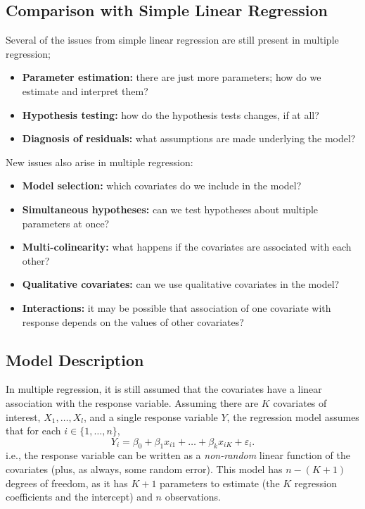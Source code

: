 \documentclass[12pt]{article}
\begin{document}
\subsection{Comparison with Simple Linear Regression}

Several of the issues from simple linear regression are still present in multiple regression; 
\begin{itemize}
    \item \textbf{Parameter estimation:} there are just more parameters; how do we estimate and interpret them?
    \item \textbf{Hypothesis testing:} how do the hypothesis tests changes, if at all?
    \item \textbf{Diagnosis of residuals:} what assumptions are made underlying the model?
\end{itemize}

New issues also arise in multiple regression:

\begin{itemize}
    \item \textbf{Model selection:} which covariates do we include in the model?
    \item \textbf{Simultaneous hypotheses:} can we test hypotheses about multiple parameters at once?
    \item \textbf{Multi-colinearity:} what happens if the covariates are associated with each other?
    \item \textbf{Qualitative covariates:} can we use qualitative covariates in the model?
    \item \textbf{Interactions:} it may be possible that association of one covariate with response depends on the values of other covariates?
\end{itemize}

\subsection{Model Description}

In multiple regression, it is still assumed that the covariates have a linear association with the response variable. Assuming there are $K$ covariates of interest, $X_1, \dots, X_l$, and a single response variable $Y$, the regression model assumes that for each $i \in \{1, \dots, n\}$, \[Y_i = \beta_0 + \beta_1 x_{i1} + \dots + \beta_k x_{iK} + \varepsilon_i.\]
i.e., the response variable can be written as a \textit{non-random} linear function of the covariates (plus, as always, some random error). This model has $n - (K + 1)$ degrees of freedom, as it has $K + 1$ parameters to estimate (the $K$ regression coefficients and the intercept) and $n$ observations.
\end{document}
